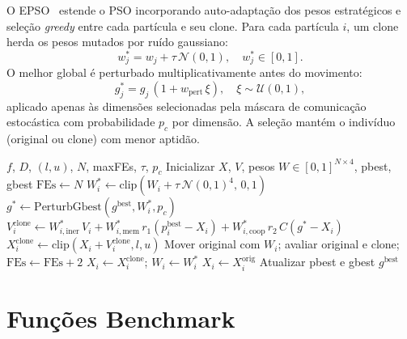 \documentclass[runningheads]{llncs}
\begin{document}
O EPSO~\cite{miranda2002} estende o PSO incorporando auto-adaptação
dos pesos estratégicos e seleção \emph{greedy} entre cada partícula e
seu clone. Para cada partícula $i$, um clone herda os pesos mutados
por ruído gaussiano:
\begin{equation}
  w_j^* = w_j + \tau\,\mathcal{N}(0,1), \quad w_j^* \in [0,1].
\end{equation}
O melhor global é perturbado multiplicativamente antes do movimento:
\begin{equation}
  g_j^* = g_j\,(1 + w_{\text{pert}}\,\xi), \quad \xi \sim \mathcal{U}(0,1),
\end{equation}
aplicado apenas às dimensões selecionadas pela máscara de comunicação
estocástica com probabilidade $p_c$ por dimensão. A seleção mantém o
indivíduo (original ou clone) com menor aptidão.

\begin{algorithm}[H]
\small
\caption{Otimização Evolutiva por Enxame de Partículas (EPSO)}
\label{alg:epso}
\begin{algorithmic}[1]
\Require $f$, $D$, $(l,u)$, $N$, maxFEs, $\tau$, $p_c$
\State Inicializar $X$, $V$, pesos $W \in [0,1]^{N\times 4}$, pbest, gbest
\State $\text{FEs} \leftarrow N$
    \State $W_i^* \leftarrow \text{clip}(W_i + \tau\,\mathcal{N}(0,1)^4,\,0,1)$
    \State $g^* \leftarrow \text{PerturbGbest}(g^{\text{best}}, W_i^*, p_c)$
    \State $V_i^{\text{clone}} \leftarrow W_{i,\text{iner}}^*\,V_i
           + W_{i,\text{mem}}^*\,r_1(p_i^{\text{best}}-X_i)
           + W_{i,\text{coop}}^*\,r_2\,C(g^*-X_i)$
    \State $X_i^{\text{clone}} \leftarrow \text{clip}(X_i+V_i^{\text{clone}},l,u)$
    \State Mover original com $W_i$; avaliar original e clone; $\text{FEs} \leftarrow \text{FEs}+2$
      \State $X_i \leftarrow X_i^{\text{clone}}$; $W_i \leftarrow W_i^*$
    \Else
      \State $X_i \leftarrow X_i^{\text{orig}}$
    \EndIf
    \State Atualizar pbest e gbest
  \EndFor
\EndWhile
\State \Return $g^{\text{best}}$
\end{algorithmic}
\end{algorithm}

\section{Fun\c{c}\~{o}es Benchmark}
\label{sec:benchmark}
\end{document}
